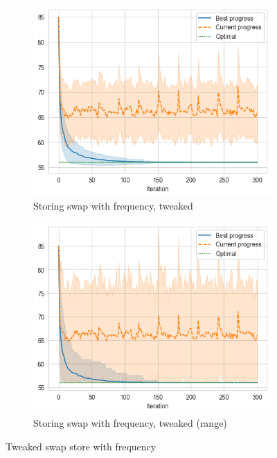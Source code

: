 \begin{figure}[ht]
    \hfill
    \begin{subfigure}{0.48\textwidth}
        \centering
        \includegraphics[width=\textwidth]{../images/p4/store-freq-tweaked.png}
        \caption{Storing swap with frequency, tweaked}
    \end{subfigure}
    \hfill
    \begin{subfigure}{0.48\textwidth}
        \centering
        \includegraphics[width=\textwidth]{../images/p4/store-freq-tweaked-pi.png}
        \caption{Storing swap with frequency, tweaked (range)}
    \end{subfigure}
    \hfill

    \caption{Tweaked swap store with frequency}
    \label{fig:p4-tweaked-freq}
\end{figure}

